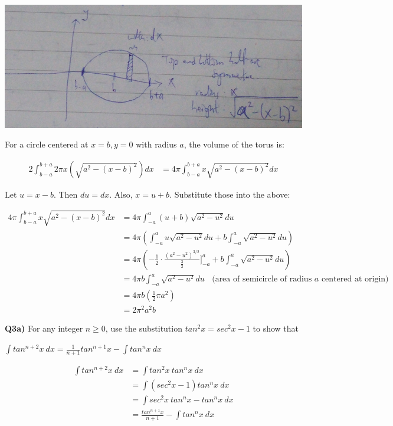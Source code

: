 \documentclass[9pt]{article}
\begin{document}
\begin{center}
  \includegraphics[scale=0.5]{q2.jpg}
\end{center}

For a circle centered at $x = b, y = 0$ with radius $a$, the volume of the torus is:

\begin{align*}
  2 \int_{b-a}^{b+a} 2 \pi x (\sqrt{a^2 - (x - b)^2}) dx &= 4 \pi \int_{b-a}^{b+a} x \sqrt{a^2 - (x - b)^2} dx
\end{align*}

Let $u = x - b$. Then $du = dx$. Also, $x = u + b$. Substitute those into the above:

\begin{align*}
  4 \pi \int_{b-a}^{b+a} x \sqrt{a^2 - (x - b)^2} dx &= 4 \pi \int_{-a}^{a} (u + b) \sqrt{a^2 - u^2} du \\
  &= 4 \pi (\int_{-a}^{a} u \sqrt{a^2 - u^2} du + b \int_{-a}^{a} \sqrt{a^2 - u^2} du) \\
  &= 4\pi ( -\frac{1}{2} \cdot \frac{({a^2 - u^2})^{3/2}}{\frac{3}{2}} \bigg]_{-a}^{a} + b \int_{-a}^{a} \sqrt{a^2 - u^2} du ) \\
  &= 4 \pi b \int_{-a}^{a} \sqrt{a^2 - u^2} du \ \ \ \ \text{(area of semicircle of radius $a$ centered at origin)} \\
  &= 4 \pi b (\frac{1}{2} \pi a^2) \\
  &= 2 \pi^2 a^2 b
\end{align*}


\begin{tcolorbox}
  \textbf{Q3a)} For any integer $n \geq 0$, use the substitution $tan^2 x = sec^2 x - 1$ to show that \\
  \begin{center}
    $\int tan^{n+2} x \ dx = \frac{1}{n + 1} tan^{n+1} x - \int tan^n x \ dx$
  \end{center}
\end{tcolorbox}

\begin{align*}
  \int tan^{n+2} x \ dx &= \int tan^2 x \ tan^n x \ dx \\
  &= \int (sec^2 x - 1) tan^n x \ dx \\
  &= \int sec^2 x \ tan^n x - tan^n x \ dx \\
  &= \frac{tan^{n+1} x}{n + 1} - \int tan^n x \ dx
\end{align*}
\end{document}
